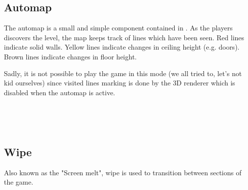 \subsection{Automap}
The automap is a small and simple component contained in . As the players discovers the level, the map keeps track of lines which have been seen. Red lines indicate solid walls. Yellow lines indicate changes in ceiling height (e.g. doors). Brown lines indicate changes in floor height.\\
\par
Sadly, it is not possible to play the game in this mode (we all tried to, let's not kid ourselves) since visited lines marking is done by the 3D renderer which is disabled when the automap is active.\\
\par
{}
\par
{}\\
\par
{}\\
\par






\subsection{Wipe}
\label{label_melt}
Also known as the "Screen melt", wipe is used to transition between sections of the game.

\par
{}

 \vspace{10pt}
\pagebreak


 \vspace{10pt}
\pagebreak

